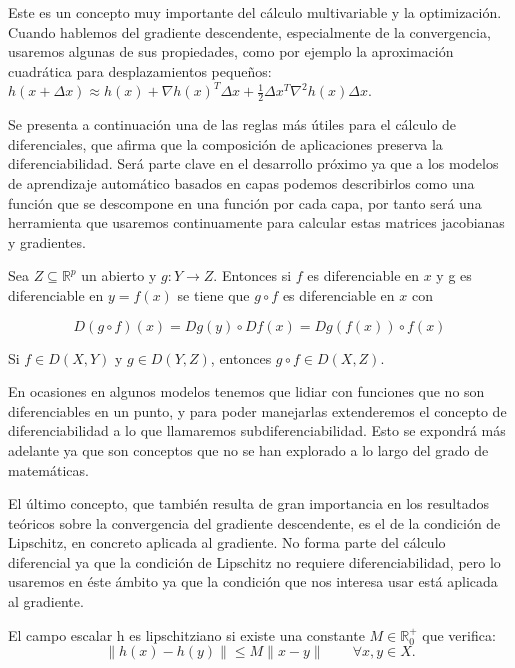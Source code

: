 Este es un concepto muy importante del cálculo multivariable y la optimización. Cuando hablemos del gradiente descendente, especialmente de la convergencia, usaremos algunas de sus propiedades, como por ejemplo la aproximación cuadrática para desplazamientos pequeños: $h(x + \Delta x) \approx h(x) + \nabla h(x)^T \Delta x + \frac{1}{2} \Delta x^T \nabla^2 h(x) \Delta x$. %
		


Se presenta a continuación una de las reglas más útiles para el cálculo de diferenciales, que afirma que la composición de aplicaciones preserva la diferenciabilidad. Será parte clave en el desarrollo próximo ya que a los modelos de aprendizaje automático basados en capas podemos describirlos como una función que se descompone en una función por cada capa, por tanto será una herramienta que usaremos continuamente para calcular estas matrices jacobianas y gradientes.

\begin{teorema}
    Sea $Z \subseteq \mathbb{R}^p$ un abierto y $g:Y \rightarrow Z$. Entonces si $f$ es diferenciable en $x$ y g es diferenciable en $y=f(x)$ se tiene que $g \circ f$ es diferenciable en $x$ con

    $$D(g \circ f)(x) = Dg(y) \circ Df(x) = Dg(f(x)) \circ f(x)$$

    \raggedright{Si $f \in D(X, Y)$ y  $g \in D(Y,Z)$, entonces $g \circ f \in D(X, Z)$.}
    
\end{teorema}


En ocasiones en algunos modelos tenemos que lidiar con funciones que no son diferenciables en un punto, y para poder manejarlas extenderemos el concepto de diferenciabilidad a lo que llamaremos subdiferenciabilidad. Esto se expondrá más adelante ya que son conceptos que no se han explorado a lo largo del grado de matemáticas.


El último concepto, que también resulta de gran importancia en los resultados teóricos sobre la convergencia del gradiente descendente, es el de la condición de Lipschitz, en concreto aplicada al gradiente. No forma parte del cálculo diferencial ya que la condición de Lipschitz no requiere diferenciabilidad, pero lo usaremos en éste ámbito ya que la condición que nos interesa usar está aplicada al gradiente.

\begin{definicion}
    El campo escalar h es lipschitziano si existe una constante $M \in \mathbb{R}_0^+$ que verifica:
    $$ \| h(x) - h(y) \| \leq M \| x - y \| \qquad \forall x,y \in X.$$
\end{definicion}

